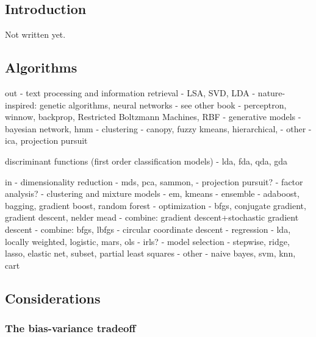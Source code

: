 


\begin{bibunit}

\chapter{Introduction}
\label{chap:intro}

Not written yet.



\section{Algorithms}

out
- text processing and information retrieval
	- LSA, SVD, LDA
- nature-inspired: genetic algorithms, neural networks - see other book
	- perceptron, winnow, backprop, Restricted Boltzmann Machines, RBF
- generative models
	- bayesian network, hmm
- clustering
	- canopy, fuzzy kmeans, hierarchical, 
- other
	- ica, projection pursuit



discriminant functions (first order classification models)
- lda, fda, qda, gda

in
- dimensionality reduction
	- mds, pca, sammon, 
	- projection pursuit? 
	- factor analysis?
- clustering and mixture models
	- em, kmeans
- ensemble
	- adaboost, bagging, gradient boost, random forest
- optimization
	- bfgs, conjugate gradient, gradient descent, nelder mead
	- combine: gradient descent+stochastic gradient descent
	- combine: bfgs, lbfgs
	- circular coordinate descent
- regression
	- lda, locally weighted, logistic, mars, ols
	- irls?
- model selection
	- stepwise, ridge, lasso, elastic net, subset, partial least squares
- other
	- naive bayes, svm, knn, cart



\section{Considerations}


\subsection{The bias-variance tradeoff}


\end{bibunit}
